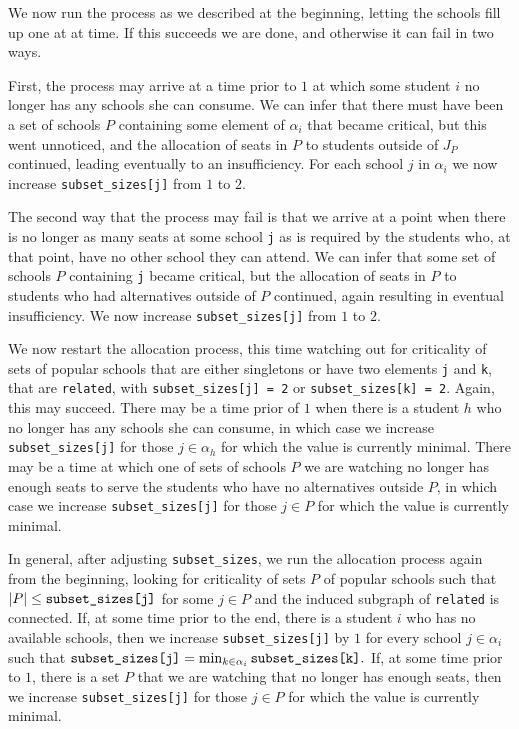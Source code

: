 \documentclass[12pt]{article}
\theoremstyle{definition}
\begin{document}
We now run the process as we described at the beginning, letting the
schools fill up one at at time.  If this succeeds we are done, and
otherwise it can fail in two ways.

First, the process may arrive at a time prior to $1$ at which some
student $i$ no longer has any schools she can consume.  We can infer
that there must have been a set of schools $P$ containing some element
of $\alpha_i$ that became critical, but this went unnoticed, and the
allocation of seats in $P$ to students outside of $J_P$ continued,
leading eventually to an insufficiency.  For each school $j$ in
$\alpha_i$ we now increase \texttt{subset\_sizes[j]} from $1$ to $2$.

The second way that the process may fail is that we arrive at a point
when there is no longer as many seats at some school \texttt{j} as is
required by the students who, at that point, have no other school they
can attend.  We can infer that some set of schools $P$ containing
\texttt{j} became critical, but the allocation of seats in $P$ to
students who had alternatives outside of $P$ continued, again
resulting in eventual insufficiency.  We now increase
\texttt{subset\_sizes[j]} from $1$ to $2$.

We now restart the allocation process, this time watching out for
criticality of sets of popular schools that are either singletons or
have two elements \texttt{j} and \texttt{k}, that are
\texttt{related}, with \texttt{subset\_sizes[j] = 2} or
\texttt{subset\_sizes[k] = 2}.  Again, this may succeed. There may be
a time prior of $1$ when there is a student $h$ who no longer has any
schools she can consume, in which case we increase
\texttt{subset\_sizes[j]} for those $j \in \alpha_h$ for which the
value is currently minimal.  There may be a time at which one of sets
of schools $P$ we are watching no longer has enough seats to serve the
students who have no alternatives outside $P$, in which case we
increase \texttt{subset\_sizes[j]} for those $j \in P$ for which the
value is currently minimal.

In general, after adjusting \texttt{subset\_sizes}, we run the
allocation process again from the beginning, looking for criticality
of sets $P$ of popular schools such that $|P| \le
\text{\texttt{subset\_sizes[j]}}$ for some $j \in P$ and the induced
subgraph of \texttt{related} is connected.  If, at some time prior to
the end, there is a student $i$ who has no available schools, then we
increase \texttt{subset\_sizes[j]} by $1$ for every school $j \in
\alpha_i$ such that $\text{\texttt{subset\_sizes[j]}} = \min_{k \in
  \alpha_i} \text{\texttt{subset\_sizes[k]}}.$ If, at some time prior
to $1$, there is a set $P$ that we are watching that no longer has
enough seats, then we increase \texttt{subset\_sizes[j]} for those $j
\in P$ for which the value is currently minimal.
\end{document}
